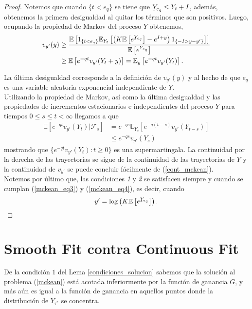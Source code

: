 \begin{proof}
Notemos que cuando $\{t < e_q\}$ se tiene que $\ubar{Y}_{e_q} \leq Y_t + I$, además, obtenemos la primera desigualdad al quitar los términos que son positivos. Luego, ocupando la propiedad de Markov del proceso $Y$ obtenemos,
\begin{align*}
	v_{y'}(y) & \geq \frac{\mathbb{E} \left[ 1_{ \{t < e_q \}} \mathbb{E}_{Y_t} \left[ \left( K  \mathbb{E} \left[ e^{\ubar{Y}_{e_q}} \right] - e^{I + y} \right) 1_{\{ - I > y - y'\}} \right] \right]}{ \mathbb{E} \left[ e^{\ubar{Y}_{e_q}} \right] } \\
	& \geq \mathbb{E} \left[ e^{- q t} v_{y'}(Y_t + y) \right] = \mathbb{E}_y \left[ e^{- q t} v_{y'}(Y_t) \right].
\end{align*}

La última desigualdad corresponde a la definición de $v_{y'}(y)$ y al hecho de que $e_q$ es una variable aleatoria exponencial independiente de $Y$. \\

Utilizando la propiedad de Markov, así como la última desigualdad y las propiedades de incrementos estacionarios e independientes del proceso $Y$ para tiempos $0 \leq s \leq t < \infty$ llegamos a que
\begin{align*}
\mathbb{E} \left[ e^{-qt} v_{y'}(Y_t) \big| \mathcal{F}_s \right] & = e^{-qs} \mathbb{E}_{Y_s} \left[ e^{-q(t-s)} v_{y'}(Y_{t-s}) \right] \\
& \leq e^{-qs} v_{y'}(Y_s)
\end{align*}
mostrando que $\{ e^{-qt} v_{y'}(Y_t) : t \geq 0 \}$ es una supermartingala. La continuidad por la derecha de las trayectorias se sigue de la continuidad de las trayectorias de $Y$ y la continuidad de $v_{y'}$ se puede concluir fácilmente de (\ref{cont_mckean}). \\

Notemos por último que, las condiciones \textit{1} y \textit{2} se satisfacen siempre y cuando se cumplan (\ref{mckean_eq3}) y (\ref{mckean_eq4}), es decir, cuando 
\begin{align*}
y' = \log \left( K \mathbb{E} \left[ e^{\ubar{Y}_{e_q}} \right] \right).
\end{align*}
\end{proof}

\section{Smooth Fit contra Continuous Fit}
De la condición $1$ del Lema \ref{condiciones_solucion} sabemos que la solución al problema (\ref{mckean}) está acotada inferiormente por la función de ganancia $G$, y más aún es igual a la función de ganancia en aquellos puntos donde la distribución de $Y_{\tau^{*}}$ se concentra. \\

